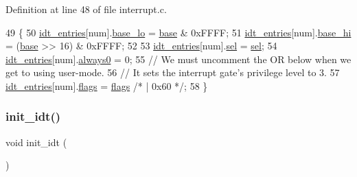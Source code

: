 Definition at line 48 of file interrupt.\+c.


\begin{DoxyCode}
49 \{
50    \hyperlink{a00065_a02c62ffc54da283f5faaa40b125d2dce_a02c62ffc54da283f5faaa40b125d2dce}{idt\_entries}[num].\hyperlink{a00146_a4b5fce0881deb4959d33da77d1ed0202_a4b5fce0881deb4959d33da77d1ed0202}{base\_lo} = \hyperlink{a00059_a0523cedff47e2441fc198b7770ec5d3f_a0523cedff47e2441fc198b7770ec5d3f}{base} & 0xFFFF;
51    \hyperlink{a00065_a02c62ffc54da283f5faaa40b125d2dce_a02c62ffc54da283f5faaa40b125d2dce}{idt\_entries}[num].\hyperlink{a00146_af46adb2603d1d8b4a3bedf7f1c6daed4_af46adb2603d1d8b4a3bedf7f1c6daed4}{base\_hi} = (\hyperlink{a00059_a0523cedff47e2441fc198b7770ec5d3f_a0523cedff47e2441fc198b7770ec5d3f}{base} >> 16) & 0xFFFF;
52 
53    \hyperlink{a00065_a02c62ffc54da283f5faaa40b125d2dce_a02c62ffc54da283f5faaa40b125d2dce}{idt\_entries}[num].\hyperlink{a00146_a3c9321c263139e56901a05efee220047_a3c9321c263139e56901a05efee220047}{sel}     = \hyperlink{a00065_af0b0a7e10694e3b600c7561311cc8271_af0b0a7e10694e3b600c7561311cc8271}{sel};
54    \hyperlink{a00065_a02c62ffc54da283f5faaa40b125d2dce_a02c62ffc54da283f5faaa40b125d2dce}{idt\_entries}[num].\hyperlink{a00146_adc747b3ff87142c71b7b8c51e03c067c_adc747b3ff87142c71b7b8c51e03c067c}{always0} = 0;
55    \textcolor{comment}{// We must uncomment the OR below when we get to using user-mode.}
56    \textcolor{comment}{// It sets the interrupt gate's privilege level to 3.}
57    \hyperlink{a00065_a02c62ffc54da283f5faaa40b125d2dce_a02c62ffc54da283f5faaa40b125d2dce}{idt\_entries}[num].\hyperlink{a00146_a02277c77564820972ae5df0a37c80be0_a02277c77564820972ae5df0a37c80be0}{flags}   = \hyperlink{a00065_aa2585d779da0ab21273a8d92de9a0ebe_aa2585d779da0ab21273a8d92de9a0ebe}{flags} \textcolor{comment}{/* | 0x60 */};
58 \}
\end{DoxyCode}
\mbox{\label{a00065_a35fe413107af682030ab7a4b6dff19b8_a35fe413107af682030ab7a4b6dff19b8}} 
\subsubsection{\texorpdfstring{init\+\_\+idt()}{init\_idt()}}
{\footnotesize\ttfamily void init\+\_\+idt (\begin{DoxyParamCaption}{ }\end{DoxyParamCaption})}



